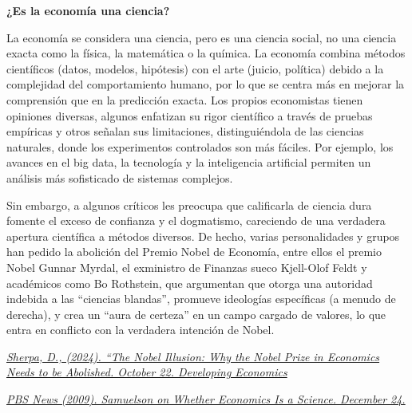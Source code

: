 \documentclass[
  letterpaper,
  DIV=11,
  numbers=noendperiod,
  oneside]{scrreprt}
\begin{document}
\begin{tcolorbox}[enhanced jigsaw, breakable, toprule=.15mm, colframe=quarto-callout-note-color-frame, leftrule=.75mm, opacityback=0, colback=white, bottomrule=.15mm, left=2mm, arc=.35mm, rightrule=.15mm]
\begin{minipage}[t]{5.5mm}
\textcolor{quarto-callout-note-color}{\faInfo}
\end{minipage}%
\begin{minipage}[t]{\textwidth - 5.5mm}

\vspace{-3mm}\textbf{¿Es la economía una ciencia?}\vspace{3mm}

La economía se considera una ciencia, pero es una ciencia social, no una
ciencia exacta como la física, la matemática o la química. La economía
combina métodos científicos (datos, modelos, hipótesis) con el arte
(juicio, política) debido a la complejidad del comportamiento humano,
por lo que se centra más en mejorar la comprensión que en la predicción
exacta. Los propios economistas tienen opiniones diversas, algunos
enfatizan su rigor científico a través de pruebas empíricas y otros
señalan sus limitaciones, distinguiéndola de las ciencias naturales,
donde los experimentos controlados son más fáciles. Por ejemplo, los
avances en el big data, la tecnología y la inteligencia artificial
permiten un análisis más sofisticado de sistemas complejos.

Sin embargo, a algunos críticos les preocupa que calificarla de ciencia
dura fomente el exceso de confianza y el dogmatismo, careciendo de una
verdadera apertura científica a métodos diversos. De hecho, varias
personalidades y grupos han pedido la abolición del Premio Nobel de
Economía, entre ellos el premio Nobel Gunnar Myrdal, el exministro de
Finanzas sueco Kjell-Olof Feldt y académicos como Bo Rothstein, que
argumentan que otorga una autoridad indebida a las ``ciencias blandas'',
promueve ideologías específicas (a menudo de derecha), y crea un ``aura
de certeza'' en un campo cargado de valores, lo que entra en conflicto
con la verdadera intención de Nobel.

\href{https://developingeconomics.org/2024/10/22/the-nobel-illusion-why-the-nobel-prize-in-economics-needs-to-be-abolished/}{\emph{Sherpa,
D., (2024). ``The Nobel Illusion: Why the Nobel Prize in Economics Needs
to be Abolished. October 22. Developing Economics}}

\href{https://www.pbs.org/newshour/economy/samuelson-on-whether-economics}{\emph{PBS
News (2009). Samuelson on Whether Economics Is a Science. December 24.}}

\end{minipage}%
\end{tcolorbox}
\end{document}
